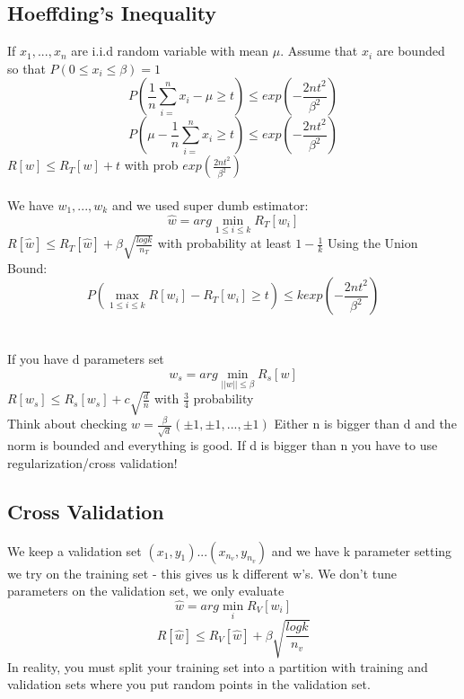 \documentclass{article}
\begin{document}
\subsection{Hoeffding's Inequality}
If $x_1,...,x_n$ are i.i.d random variable with mean $\mu$. Assume that $x_i$ are bounded so that $P(0\leq x_i \leq \beta) = 1$
$$P(\frac{1}{n} \sum_{i=}^n x_i - \mu \geq t) \leq exp(-\frac{2nt^2}{\beta^2})$$
$$P(\mu - \frac{1}{n} \sum_{i=}^n x_i \geq t) \leq exp(-\frac{2nt^2}{\beta^2})$$
$R[w] \leq R_T[w] + t$ with prob $exp(\frac{2nt^2}{\beta^2})$\\ \\
We have $w_1,...,w_k$ and we used super dumb estimator: 
$$\hat{w} = arg \min_{1\leq i \leq k} R_T[w_i]$$
$R[\hat{w}] \leq R_T[\hat{w}] + \beta \sqrt{\frac{log k}{n_T}}$ with probability at least $1 - \frac{1}{k}$
Using the Union Bound:
$$P(\max_{1 \leq i \leq k} R[w_i] - R_T[w_i] \geq t) \leq k exp(-\frac{2nt^2}{\beta^2})$$ \\ \\
If you have d parameters set
$$w_s = arg \min_{||w|| \leq \beta} R_s[w]$$
$R[w_s] \leq R_s[w_s] + c\sqrt{\frac{d}{n}}$ with $\frac{3}{4}$ probability \\
Think about checking $w = \frac{\beta}{\sqrt{d}} (\pm 1, \pm 1,..., \pm 1)$
Either n is bigger than d and the norm is bounded and everything is good. If d is bigger than n you have to use regularization/cross validation!

\subsection{Cross Validation}
We keep a validation set $(x_1, y_1)...(x_{n_v}, y_{n_v})$ and we have k parameter setting we try on the training set - this gives us k different w's. We don't tune parameters on the validation set, we only evaluate
$$\hat{w} = arg \min_i R_V[w_i]$$
$$R[\hat{w}] \leq R_V[\hat{w}] + \beta \sqrt{\frac{log k}{n_v}}$$
In reality, you must split your training set into a partition with training and validation sets where you put random points in the validation set.
\end{document}
